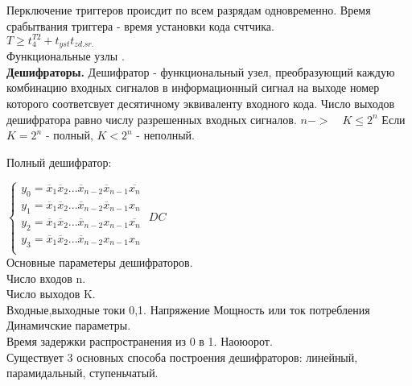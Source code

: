 Перключение триггеров происдит по всем разрядам одновременно.
Время срабытвания триггера - время установки кода счтчика.\\
$T \geq t_4^{T2} + t_{yst} t_{zd.sr.}$\\


Функциональные узлы .\\
\textbf{Дешифраторы.}
Дешифратор - функциональный узел, преобразующий каждую комбинацию входных сигналов в информационный
сигнал на выходе номер которого соответсвует десятичному эквиваленту входного кода.
Число выходов дешифратора равно числу разрешенных входных сигналов. $ n -> \quad K \leq 2^n$ Если  $K = 2^n$ - полный,  $K < 2^n$ - неполный.

Полный дешифратор:

$\begin{cases}
  y_0 = \overline{x}_1 \overline{x}_2 ... \overline{x}_{n-2} \overline{x}_{n-1} \overline{x_n} \\
  y_1 = \overline{x}_1 \overline{x}_2 ... \overline{x}_{n-2} \overline{x}_{n-1} {x_n}\\
  y_2=  \overline{x}_1 \overline{x}_2 ... \overline{x}_{n-2} x_{n-1} \overline{x_n}\\
  y_3=  \overline{x}_1 \overline{x}_2 ... \overline{x}_{n-2} x_{n-1} {x_n} \\

\end{cases}$
$DC $\\
Основные параметеры дешифраторов.\\
Число входов n.\\
Число выходов K.\\
Входные,выходные токи 0,1.
Напряжение
Мощность или ток потребления \\

Динамичские параметры.\\
Время задержки распространения из 0 в 1. Наоюорот.\\

Существует 3 основных способа построения дешифраторов: линейный, парамидальный, ступеньчатый.




